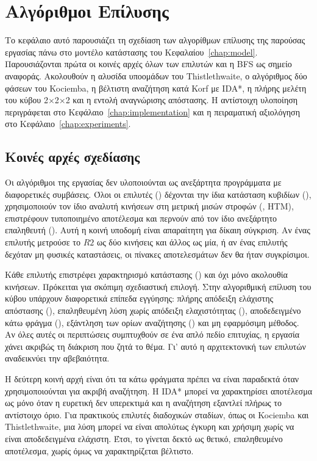 \chapter{Αλγόριθμοι Επίλυσης}
\label{chap:algorithms}

Το κεφάλαιο αυτό παρουσιάζει τη σχεδίαση των αλγορίθμων επίλυσης της παρούσας εργασίας πάνω στο μοντέλο κατάστασης του Κεφαλαίου~\ref{chap:model}. Παρουσιάζονται πρώτα οι κοινές αρχές όλων των επιλυτών και η BFS ως σημείο αναφοράς. Ακολουθούν η αλυσίδα υποομάδων του Thistlethwaite, ο αλγόριθμος δύο φάσεων του Kociemba, η βέλτιστη αναζήτηση κατά Korf με IDA*, η πλήρης μελέτη του κύβου 2×2×2 και η εντολή αναγνώρισης απόστασης. Η αντίστοιχη υλοποίηση περιγράφεται στο Κεφάλαιο~\ref{chap:implementation} και η πειραματική αξιολόγηση στο Κεφάλαιο~\ref{chap:experiments}.

\section{Κοινές αρχές σχεδίασης}
\label{sec:algorithms-principles}
Οι αλγόριθμοι της εργασίας δεν υλοποιούνται ως ανεξάρτητα προγράμματα με διαφορετικές συμβάσεις. Όλοι οι επιλυτές () δέχονται την ίδια κατάσταση κυβιδίων (), χρησιμοποιούν τον ίδιο αναλυτή κινήσεων στη μετρική μισών στροφών (, HTM), επιστρέφουν τυποποιημένο αποτέλεσμα και περνούν από τον ίδιο ανεξάρτητο επαληθευτή (). Αυτή η κοινή υποδομή είναι απαραίτητη για δίκαιη σύγκριση. Αν ένας επιλυτής μετρούσε το \(R2\) ως δύο κινήσεις και άλλος ως μία, ή αν ένας επιλυτής δεχόταν μη φυσικές καταστάσεις, οι πίνακες αποτελεσμάτων δεν θα ήταν συγκρίσιμοι.

Κάθε επιλυτής επιστρέφει χαρακτηρισμό κατάστασης () και όχι μόνο ακολουθία κινήσεων. Πρόκειται για σκόπιμη σχεδιαστική επιλογή. Στην αλγοριθμική επίλυση του κύβου υπάρχουν διαφορετικά επίπεδα εγγύησης: πλήρης απόδειξη ελάχιστης απόστασης (), επαληθευμένη λύση χωρίς απόδειξη ελαχιστότητας (), αποδεδειγμένο κάτω φράγμα (), εξάντληση των ορίων αναζήτησης () και μη εφαρμόσιμη μέθοδος. Αν όλες αυτές οι περιπτώσεις συμπτυχθούν σε ένα απλό πεδίο επιτυχίας, η εργασία χάνει ακριβώς τη διάκριση που ζητά το θέμα. Γι' αυτό η αρχιτεκτονική των επιλυτών αναδεικνύει την αβεβαιότητα.

Η δεύτερη κοινή αρχή είναι ότι τα κάτω φράγματα πρέπει να είναι παραδεκτά όταν χρησιμοποιούνται για ακριβή αναζήτηση. Η IDA* μπορεί να χαρακτηρίσει αποτέλεσμα ως  μόνο όταν η ευρετική δεν υπερεκτιμά και η αναζήτηση εξαντλεί πλήρως το αντίστοιχο όριο. Για πρακτικούς επιλυτές διαδοχικών σταδίων, όπως οι Kociemba και Thistlethwaite, μια λύση μπορεί να είναι απολύτως έγκυρη και χρήσιμη χωρίς να είναι αποδεδειγμένα ελάχιστη. Έτσι, το  γίνεται δεκτό ως θετικό, επαληθευμένο αποτέλεσμα, χωρίς όμως να χαρακτηρίζεται βέλτιστο.

